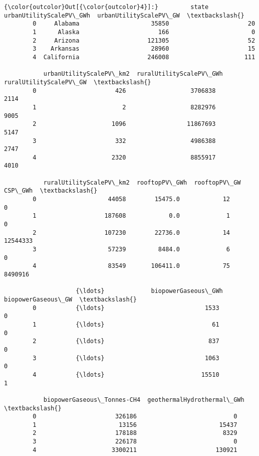 \documentclass[11pt]{article}
\begin{document}
\begin{Verbatim}[commandchars=\\\{\}]
{\color{outcolor}Out[{\color{outcolor}4}]:}         state  urbanUtilityScalePV\_GWh  urbanUtilityScalePV\_GW  \textbackslash{}
        0     Alabama                    35850                      20   
        1      Alaska                      166                       0   
        2     Arizona                   121305                      52   
        3    Arkansas                    28960                      15   
        4  California                   246008                     111   
        
           urbanUtilityScalePV\_km2  ruralUtilityScalePV\_GWh  ruralUtilityScalePV\_GW  \textbackslash{}
        0                      426                  3706838                    2114   
        1                        2                  8282976                    9005   
        2                     1096                 11867693                    5147   
        3                      332                  4986388                    2747   
        4                     2320                  8855917                    4010   
        
           ruralUtilityScalePV\_km2  rooftopPV\_GWh  rooftopPV\_GW   CSP\_GWh  \textbackslash{}
        0                    44058        15475.0            12         0   
        1                   187608            0.0             1         0   
        2                   107230        22736.0            14  12544333   
        3                    57239         8484.0             6         0   
        4                    83549       106411.0            75   8490916   
        
                    {\ldots}             biopowerGaseous\_GWh  biopowerGaseous\_GW  \textbackslash{}
        0           {\ldots}                            1533                   0   
        1           {\ldots}                              61                   0   
        2           {\ldots}                             837                   0   
        3           {\ldots}                            1063                   0   
        4           {\ldots}                           15510                   1   
        
           biopowerGaseous\_Tonnes-CH4  geothermalHydrothermal\_GWh  \textbackslash{}
        0                      326186                           0   
        1                       13156                       15437   
        2                      178188                        8329   
        3                      226178                           0   
        4                     3300211                      130921   
        

\end{Verbatim}
\end{document}
